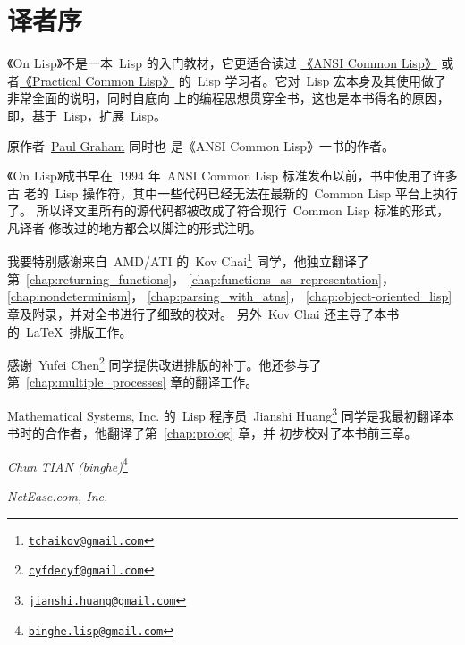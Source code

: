 
\chapter*{译者序}
\label{chap:preface-cn}

《On Lisp》不是一本~Lisp 的入门教材，它更适合读过%
\href{http://www.paulgraham.com/acl.html}{《ANSI Common Lisp》}%
或者\href{http://gigamonkeys.com/book/}{《Practical Common Lisp》}%
的~Lisp 学习者。它对~Lisp 宏本身及其使用做了非常全面的说明，同时自底向
上的编程思想贯穿全书，这也是本书得名的原因，即，基于~Lisp，扩展~Lisp。

原作者~\href{http://www.paulgraham.com/}{Paul Graham} 同时也
是《ANSI Common Lisp》一书的作者。

《On Lisp》成书早在~1994 年~ANSI Common Lisp 标准发布以前，书中使用了许多古
老的~Lisp 操作符，其中一些代码已经无法在最新的~Common Lisp 平台上执行了。
所以译文里所有的源代码都被改成了符合现行~Common Lisp 标准的形式，凡译者
修改过的地方都会以脚注的形式注明。

我要特别感谢来自~AMD/ATI 的~Kov Chai\footnote{
\href{mailto:tchaikov@gmail.com}{\texttt{tchaikov@gmail.com}}}
同学，他独立翻译了第~\ref{chap:returning_functions}，
\ref{chap:functions_as_representation}，
\ref{chap:nondeterminism}，
\ref{chap:parsing_with_atns}，
\ref{chap:object-oriented_lisp} 章及附录，并对全书进行了细致的校对。
另外~Kov Chai 还主导了本书的~\LaTeX~排版工作。

感谢~Yufei Chen\footnote{
\href{mailto:cyfdecyf@gmail.com}{\texttt{cyfdecyf@gmail.com}}}
同学提供改进排版的补丁。他还参与了第~\ref{chap:multiple_processes}
章的翻译工作。

Mathematical Systems, Inc. 的~Lisp 程序员~Jianshi Huang\footnote{
\href{mailto:jianshi.huang@gmail.com}{\texttt{jianshi.huang@gmail.com}}}
同学是我最初翻译本书时的合作者，他翻译了第~\ref{chap:prolog} 章，并
初步校对了本书前三章。

\vfill
\hfill \emph{Chun TIAN (binghe)}\footnote{
  \href{mailto:binghe.lisp@gmail.com}{\texttt{binghe.lisp@gmail.com}}}

\hfill \emph{NetEase.com, Inc.}
\vfill


